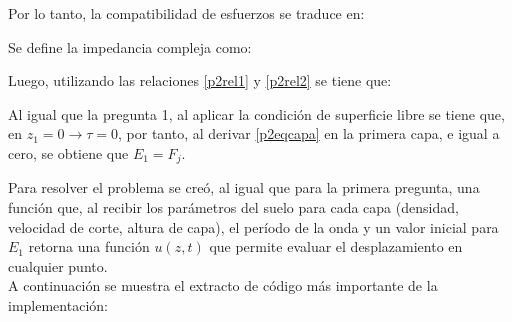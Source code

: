 Por lo tanto, la compatibilidad de esfuerzos se traduce en:



Se define la impedancia compleja como:


Luego, utilizando las relaciones \eqref{p2rel1} y \eqref{p2rel2} se tiene que:


Al igual que la pregunta 1, al aplicar la condición de superficie libre se tiene que, en $z_1=0 \rightarrow \tau=0$, por tanto, al derivar \eqref{p2eqcapa} en la primera capa, e igual a cero, se obtiene que $E_1 = F_j$.


Para resolver el problema se creó, al igual que para la primera pregunta, una función que, al recibir los parámetros del suelo para cada capa (densidad, velocidad de corte, altura de capa), el período de la onda y un valor inicial para $E_1$ retorna una función $u(z,t)$ que permite evaluar el desplazamiento en cualquier punto. \\

A continuación se muestra el extracto de código más importante de la implementación:


